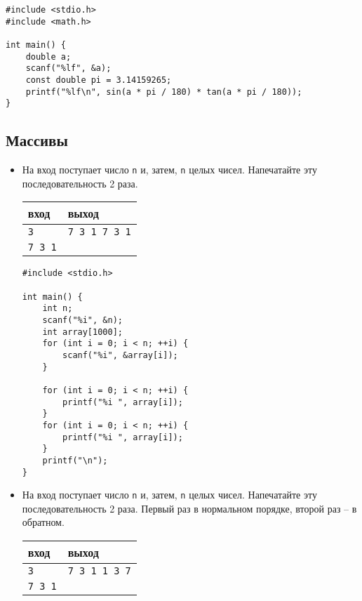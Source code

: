 \documentclass{article}
\begin{document}
\begin{itemize}
\begin{lstlisting}[backgroundcolor = \color{solcolor}]
#include <stdio.h>
#include <math.h>

int main() {
    double a;
    scanf("%lf", &a);
    const double pi = 3.14159265;
    printf("%lf\n", sin(a * pi / 180) * tan(a * pi / 180));
}
\end{lstlisting}
\end{itemize}

\newpage
\subsection*{Массивы}
\begin{itemize}
\item На вход поступает число \texttt{n} и, затем, \texttt{n} целых чисел. Напечатайте эту последовательность 2 раза.
\begin{center}
\begin{tabular}{ l | l }
 вход & выход \\ \hline
 \texttt{3} & \texttt{7 3 1 7 3 1}  \\ 
 \texttt{7 3 1} &  \\ 
\end{tabular}
\end{center}

\begin{lstlisting}[backgroundcolor = \color{solcolor}]
#include <stdio.h>

int main() {
    int n;
    scanf("%i", &n);
    int array[1000];
    for (int i = 0; i < n; ++i) {
        scanf("%i", &array[i]);
    }
    
    for (int i = 0; i < n; ++i) {
        printf("%i ", array[i]);
    }
    for (int i = 0; i < n; ++i) {
        printf("%i ", array[i]);
    }
    printf("\n");
}
\end{lstlisting}

\item На вход поступает число \texttt{n} и, затем, \texttt{n} целых чисел. Напечатайте эту последовательность 2 раза. Первый раз в нормальном порядке, второй раз -- в обратном.
\begin{center}
\begin{tabular}{ l | l }
 вход & выход \\ \hline
 \texttt{3} & \texttt{7 3 1 1 3 7}  \\ 
 \texttt{7 3 1} &  \\ 
\end{tabular}
\end{center}


\end{itemize}
\end{document}
